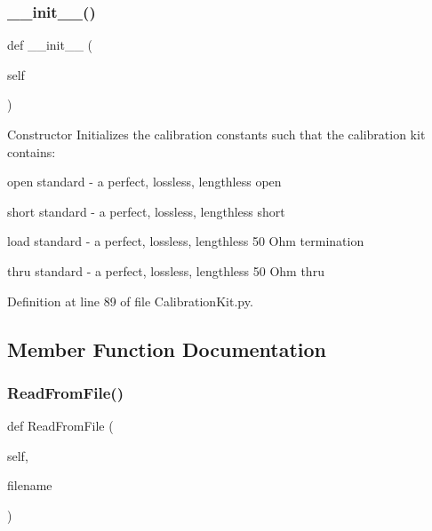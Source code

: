 \subsubsection{\texorpdfstring{\+\_\+\+\_\+init\+\_\+\+\_\+()}{\_\_init\_\_()}}
{\footnotesize\ttfamily def \+\_\+\+\_\+init\+\_\+\+\_\+ (\begin{DoxyParamCaption}\item[{}]{self }\end{DoxyParamCaption})}



Constructor Initializes the calibration constants such that the calibration kit contains\+: 


\begin{DoxyItemize}
\item open standard -\/ a perfect, lossless, lengthless open
\item short standard -\/ a perfect, lossless, lengthless short
\item load standard -\/ a perfect, lossless, lengthless 50 Ohm termination
\item thru standard -\/ a perfect, lossless, lengthless 50 Ohm thru 
\end{DoxyItemize}

Definition at line 89 of file Calibration\+Kit.\+py.



\subsection{Member Function Documentation}
\mbox{\label{classSignalIntegrity_1_1Measurement_1_1CalKit_1_1CalibrationKit_1_1CalibrationConstants_a3dc78f8134b7196685f6b0b5ace5e33b}} 
\subsubsection{\texorpdfstring{Read\+From\+File()}{ReadFromFile()}}
{\footnotesize\ttfamily def Read\+From\+File (\begin{DoxyParamCaption}\item[{}]{self,  }\item[{}]{filename }\end{DoxyParamCaption})}



